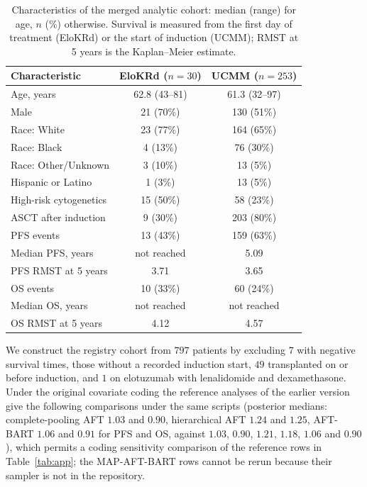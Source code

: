 \begin{table}[htbp]
\centering
\caption{Characteristics of the merged analytic cohort: median (range) for age, $n$ (\%) otherwise. Survival is measured from the first day of treatment (EloKRd) or the start of induction (UCMM); RMST at 5 years is the Kaplan--Meier estimate.}
\label{tab:baseline}
\small
\begin{tabular}{lcc}
\toprule
Characteristic & EloKRd ($n=30$) & UCMM ($n=253$) \\
\midrule
Age, years & 62.8 (43--81) & 61.3 (32--97) \\
Male & 21 (70\%) & 130 (51\%) \\
Race: White & 23 (77\%) & 164 (65\%) \\
Race: Black & 4 (13\%) & 76 (30\%) \\
Race: Other/Unknown & 3 (10\%) & 13 (5\%) \\
Hispanic or Latino & 1 (3\%) & 13 (5\%) \\
High-risk cytogenetics & 15 (50\%) & 58 (23\%) \\
ASCT after induction & 9 (30\%) & 203 (80\%) \\
PFS events & 13 (43\%) & 159 (63\%) \\
Median PFS, years & not reached & 5.09 \\
PFS RMST at 5 years & 3.71 & 3.65 \\
OS events & 10 (33\%) & 60 (24\%) \\
Median OS, years & not reached & not reached \\
OS RMST at 5 years & 4.12 & 4.57 \\
\bottomrule
\end{tabular}
\end{table}

We construct the registry cohort from $797$ patients by excluding $7$ with negative survival times, those without a recorded induction start, $49$ transplanted on or before induction, and $1$ on elotuzumab with lenalidomide and dexamethasone. Under the original covariate coding the reference analyses of the earlier version give the following comparisons under the same scripts (posterior medians: complete-pooling AFT $1.03$ and $0.90$, hierarchical AFT $1.24$ and $1.25$, AFT-BART $1.06$ and $0.91$ for PFS and OS, against $1.03$, $0.90$, $1.21$, $1.18$, $1.06$ and $0.90$), which permits a coding sensitivity comparison of the reference rows in Table~\ref{tab:app}; the MAP-AFT-BART rows cannot be rerun because their sampler is not in the repository.


